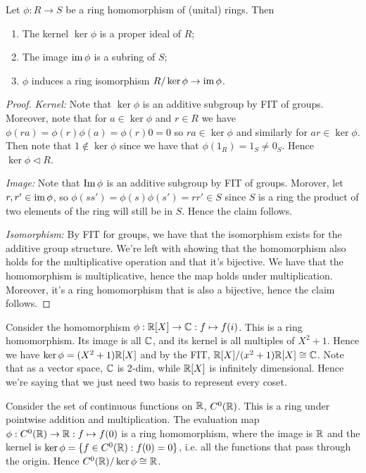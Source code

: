 \begin{theorem}
  Let $\phi:R\to S$ be a ring homomorphism of (unital) rings. Then
  \begin{enumerate}
    \item The kernel $\ker\phi$ is a proper ideal of $R$;
    \item The image $\operatorname{im}\phi$ is a subring of $S$;
    \item $\phi$ induces a ring isomorphism $R/\ker\phi \to \operatorname{im}\phi$.
  \end{enumerate}
\end{theorem}
\begin{proof}
  \emph{Kernel:} Note that $\ker\phi$ is an additive subgroup by FIT of groups. Moreover,
  note that for $a\in\ker\phi$ and $r\in R$ we have $\phi(ra)=\phi(r)\phi(a)=\phi(r)0=0$
  so $ra\in\ker\phi$ and similarly for $ar\in\ker\phi$. Then note that $1\not\in\ker \phi$
  since we have that $\phi(1_R)=1_S\neq 0_S$. Hence $\ker\phi\lhd R$.

  \emph{Image:} Note that $\operatorname{Im}\phi$ is an additive subgroup by FIT of groups. Morover, let
  $r,r'\in\operatorname{im}\phi$, so $\phi(ss')=\phi(s)\phi(s')=rr'\in S$ since $S$ is a ring the
  product of two elements of the ring will still be in $S$. Hence the claim follows.

  \emph{Isomorphism:} By FIT for groups, we have that the isomorphism exists for the
  additive group structure. We're left with showing that the homomorphism also holds for
  the multiplicative operation and that it's bijective. We have that the homomorphism is
  multiplicative, hence the map holds under multiplication. Moreover, it's a ring
  homomorphism that is also a bijective, hence the claim follows.
\end{proof}

\begin{example}
  Consider the homomorphism $\phi: \mathbb R[X]\to \mathbb C:f\mapsto f(i)$. This is a ring
  homomorphism. Its image is all $\mathbb C$, and its kernel is all multiples of $X^2+1$. Hence
  we have $\ker\phi=(X^2+1)\mathbb R[X]$ and by the FIT, $\mathbb R[X]/(x^2+1)\mathbb R[X]\cong \mathbb C$. Note
  that as a vector space, $\mathbb C$ is 2-dim, while $\mathbb R[X]$ is infinitely dimensional. Hence
  we're saying that we just need two basis to represent every coset. 
\end{example}
\begin{example}[In analysis]
  Consider the set of continuous functions on $\mathbb R$, $C^0(\mathbb R)$. This is a ring under
  pointwise addition and multiplication. The evaluation map $\phi:C^0(\mathbb R)\to \mathbb R:f\mapsto
  f(0)$ is a ring homomorphism, where the image is $\mathbb R$ and the kernel is
  $\ker\phi=\{f\in C^0(\mathbb R): f(0)=0\}$, i.e. all the functions that pass through the
  origin. Hence $C^0(\mathbb R)/\ker\phi \cong \mathbb R$.
\end{example}


